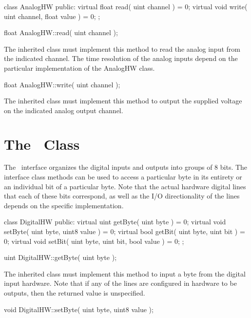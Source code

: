 \begin{classdef}
class AnalogHW {
public:
  virtual float read( uint channel ) = 0;
  virtual void  write( uint channel, float value ) = 0;
};
\end{classdef}

\begin{prototype}
float AnalogHW::read( uint channel );
\end{prototype}

The inherited class must implement this method to read the analog input from
the indicated channel. The time resolution of the analog inputs depend on
the particular implementation of the AnalogHW class.

\begin{prototype}
float AnalogHW::write( uint channel );
\end{prototype}

The inherited class must implement this method to output the supplied
voltage on the indicated analog output channel.

\section{The \DigitalHW\ Class}
\label{sec:digital_class}

The \DigitalHW\ interface organizes the digital inputs and outputs into
groups of 8 bits. The interface class methods can be used to access a
particular byte in its entirety or an individual bit of a particular
byte. Note that the actual hardware digital lines that each of these bits
correspond, as well as the I/O directionality of the lines depends on the
specific implementation.

\begin{classdef}
class DigitalHW {
public:
  virtual uint   getByte( uint byte ) = 0;
  virtual void   setByte( uint byte, uint8 value ) = 0;
  virtual bool   getBit( uint byte, uint bit ) = 0;
  virtual void   setBit( uint byte, uint bit, bool value ) = 0;
};
\end{classdef}

\begin{prototype}
uint DigitalHW::getByte( uint byte );
\end{prototype}

The inherited class must implement this method to input a byte from the
digital input hardware. Note that if any of the lines are configured in
hardware to be outputs, then the returned value is unspecified.

\begin{prototype}
void DigitalHW::setByte( uint byte, uint8 value );
\end{prototype}

